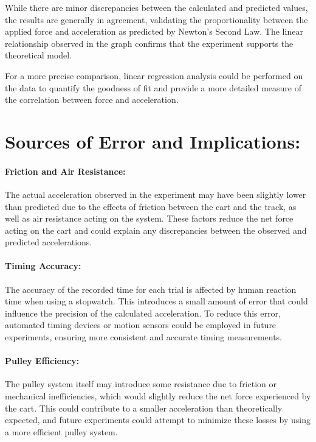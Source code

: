 ﻿\documentclass[reprint,amsmath,amssymb,aps]{revtex4-2}
\begin{document}
While there are minor discrepancies between the calculated and predicted values, the results are generally in agreement, validating the proportionality between the applied force and acceleration as predicted by Newton's Second Law. The linear relationship observed in the graph confirms that the experiment supports the theoretical model.

For a more precise comparison, linear regression analysis could be performed on the data to quantify the goodness of fit and provide a more detailed measure of the correlation between force and acceleration.
 

\section{Sources of Error and Implications:}

\paragraph{Friction and Air Resistance:}

The actual acceleration observed in the experiment may have been slightly lower than predicted due to the effects of friction between the cart and the track, as well as air resistance acting on the system. These factors reduce the net force acting on the cart and could explain any discrepancies between the observed and predicted accelerations.

\paragraph{Timing Accuracy:}

The accuracy of the recorded time for each trial is affected by human reaction time when using a stopwatch. This introduces a small amount of error that could influence the precision of the calculated acceleration. To reduce this error, automated timing devices or motion sensors could be employed in future experiments, ensuring more consistent and accurate timing measurements.

\paragraph{Pulley Efficiency:}

The pulley system itself may introduce some resistance due to friction or mechanical inefficiencies, which would slightly reduce the net force experienced by the cart. This could contribute to a smaller acceleration than theoretically expected, and future experiments could attempt to minimize these losses by using a more efficient pulley system.
\end{document}
